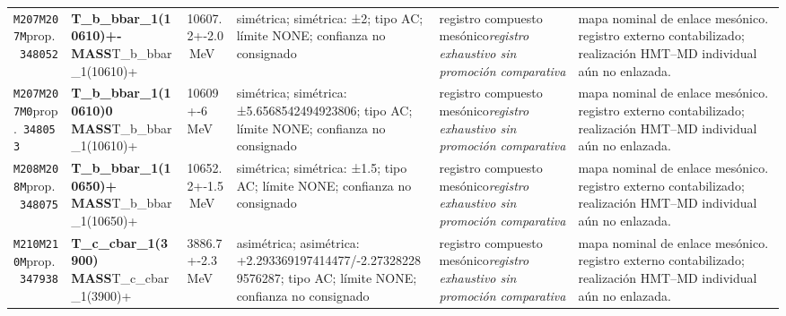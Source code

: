 \begin{landscape}
\begin{longtable}{L{1.85cm}L{4.45cm}L{2.35cm}L{4.05cm}L{3.35cm}L{7.15cm}}
\texttt{M207}\newline \texttt{M207M}\newline prop.\ \texttt{348052} & \textbf{T\_\allowbreak{}b\_\allowbreak{}bbar\_\allowbreak{}1(10610)+- MASS}\newline T\_\allowbreak{}b\_\allowbreak{}bbar\_\allowbreak{}1(10610)+ & 10607.2+-2.0\,MeV & simétrica; simétrica: ±2; tipo AC; límite NONE; confianza no consignado & registro compuesto mesónico\newline \emph{registro exhaustivo sin promoción comparativa} & mapa nominal de enlace mesónico. registro externo contabilizado; realización HMT--MD individual aún no enlazada. \\
\texttt{M207}\newline \texttt{M207M0}\newline prop.\ \texttt{348053} & \textbf{T\_\allowbreak{}b\_\allowbreak{}bbar\_\allowbreak{}1(10610)0 MASS}\newline T\_\allowbreak{}b\_\allowbreak{}bbar\_\allowbreak{}1(10610)+ & 10609+-6\,MeV & simétrica; simétrica: ±5.6568542494923806; tipo AC; límite NONE; confianza no consignado & registro compuesto mesónico\newline \emph{registro exhaustivo sin promoción comparativa} & mapa nominal de enlace mesónico. registro externo contabilizado; realización HMT--MD individual aún no enlazada. \\
\texttt{M208}\newline \texttt{M208M}\newline prop.\ \texttt{348075} & \textbf{T\_\allowbreak{}b\_\allowbreak{}bbar\_\allowbreak{}1(10650)+ MASS}\newline T\_\allowbreak{}b\_\allowbreak{}bbar\_\allowbreak{}1(10650)+ & 10652.2+-1.5\,MeV & simétrica; simétrica: ±1.5; tipo AC; límite NONE; confianza no consignado & registro compuesto mesónico\newline \emph{registro exhaustivo sin promoción comparativa} & mapa nominal de enlace mesónico. registro externo contabilizado; realización HMT--MD individual aún no enlazada. \\
\texttt{M210}\newline \texttt{M210M}\newline prop.\ \texttt{347938} & \textbf{T\_\allowbreak{}c\_\allowbreak{}cbar\_\allowbreak{}1(3900) MASS}\newline T\_\allowbreak{}c\_\allowbreak{}cbar\_\allowbreak{}1(3900)+ & 3886.7+-2.3\,MeV & asimétrica; asimétrica: +2.293369197414477/-2.273282289576287; tipo AC; límite NONE; confianza no consignado & registro compuesto mesónico\newline \emph{registro exhaustivo sin promoción comparativa} & mapa nominal de enlace mesónico. registro externo contabilizado; realización HMT--MD individual aún no enlazada. \\

\end{longtable}
\end{landscape}

